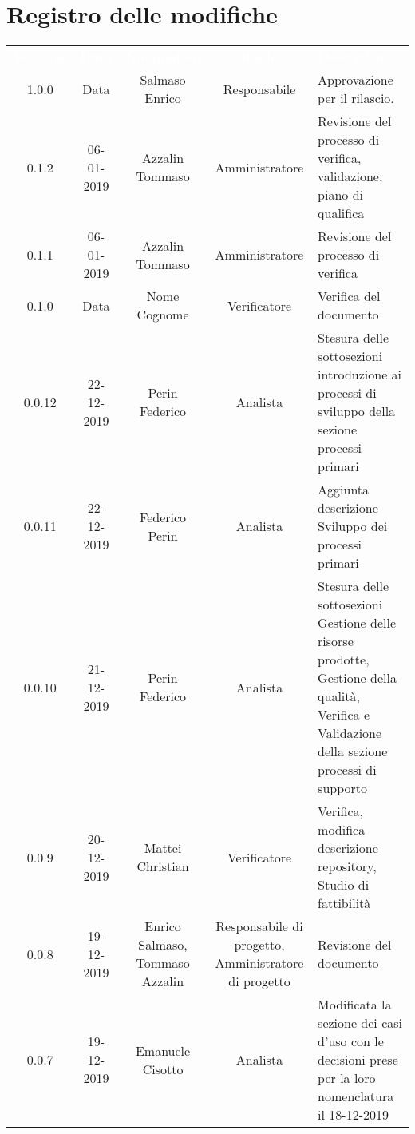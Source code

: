 \section*{Registro delle modifiche}
{
\renewcommand{\arraystretch}{1.5}
\centering
\begin{longtable}{ c c  c  c C{4cm}}
\textcolor{white}{\textbf{Versione}} & \textcolor{white}{\textbf{Data}} & \textcolor{white}{\textbf{Nominativo}} & \textcolor{white}{\textbf{Ruolo}} & \textcolor{white}{\textbf{Descrizione}}\\	


1.0.0 & Data & Salmaso Enrico & Responsabile & Approvazione per il rilascio.  \\

0.1.2 & 06-01-2019 & Azzalin Tommaso & Amministratore & Revisione del processo di verifica, validazione, piano di qualifica \\

0.1.1 & 06-01-2019 & Azzalin Tommaso & Amministratore & Revisione del processo di verifica \\

0.1.0 & Data & Nome Cognome & Verificatore & Verifica del documento \\

0.0.12 & 22-12-2019 & Perin Federico & Analista & Stesura delle sottosezioni introduzione ai processi di sviluppo della sezione processi primari\\

0.0.11 & 22-12-2019 & Federico Perin & Analista & Aggiunta descrizione Sviluppo dei processi primari \\

0.0.10 & 21-12-2019 & Perin Federico & Analista & Stesura delle sottosezioni Gestione delle risorse prodotte, Gestione della qualità, Verifica e Validazione della sezione processi di supporto \\

0.0.9 & 20-12-2019 & Mattei Christian & Verificatore & Verifica, modifica descrizione repository, Studio di fattibilità \\

0.0.8 & 19-12-2019 & Enrico Salmaso, Tommaso Azzalin & Responsabile di progetto, Amministratore di progetto & Revisione del documento \\

0.0.7 & 19-12-2019 & Emanuele Cisotto & Analista & Modificata la sezione dei casi d’uso con le decisioni prese per la loro nomenclatura il 18-12-2019 \\


\end{longtable}}
